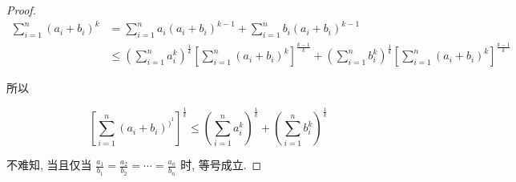 \begin{proof}
	$$
	\begin{aligned}
	\sum_{i=1}^{n}\left(a_{i}+b_{i}\right)^{k} & =\sum_{i=1}^{n} a_{i}\left(a_{i}+b_{i}\right)^{k-1}+\sum_{i=1}^{n} b_{i}\left(a_{i}+b_{i}\right)^{k-1} \\
	& \leqslant\left(\sum_{i=1}^{n} a_{i}^{k}\right)^{\frac{1}{k}}\left[\sum_{i=1}^{n}\left(a_{i}+b_{i}\right)^{k}\right]^{\frac{k-1}{k}}+\left(\sum_{i=1}^{n} b_{i}^{k}\right)^{\frac{1}{k}}\left[\sum_{i=1}^{n}\left(a_{i}+b_{i}\right)^{k}\right]^{\frac{k-1}{k}}
	\end{aligned}
	$$
	
	所以
	
	$$
	\left[\sum_{i=1}^{n}\left(a_{i}+b_{i}\right)^{)^{1}}\right]^{\frac{1}{k}} \leqslant\left(\sum_{i=1}^{n} a_{i}^{k}\right)^{\frac{1}{k}}+\left(\sum_{i=1}^{n} b_{i}^{k}\right)^{\frac{1}{k}}
	$$
	
	不难知, 当且仅当 $\frac{a_{1}}{b_{1}}=\frac{a_{2}}{b_{2}}=\cdots=\frac{a_{n}}{b_{n}}$ 时, 等号成立.
\end{proof}


